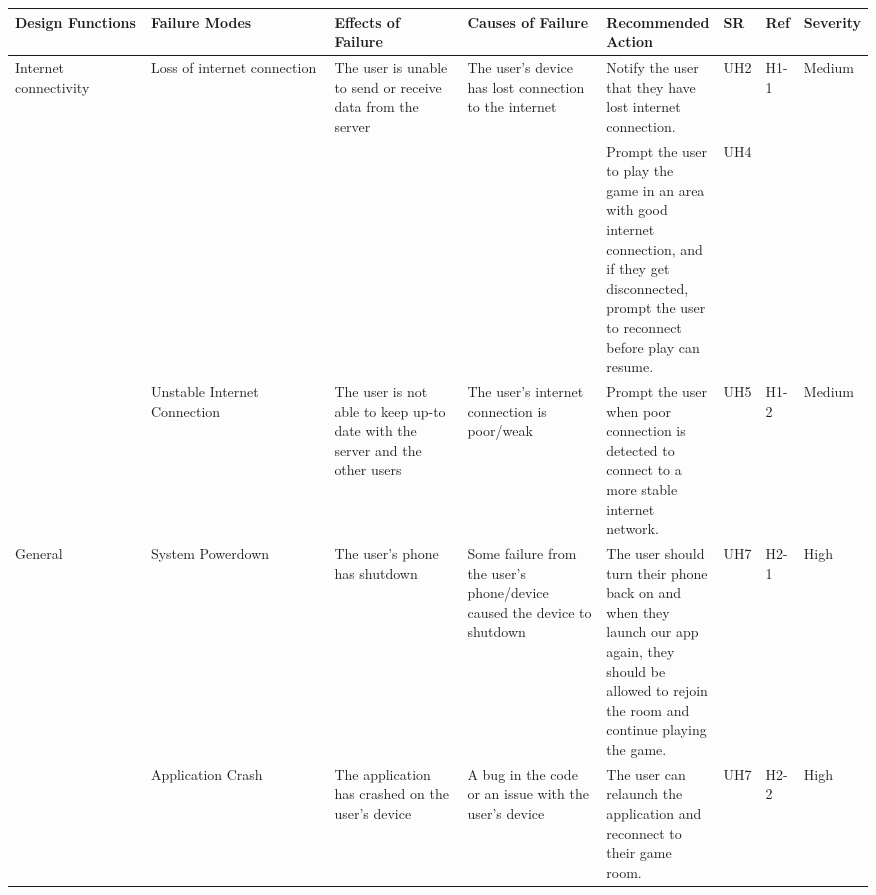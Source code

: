 \documentclass{article}
\begin{document}
\begin{table}[H]
    \begin{adjustbox}{width=(/5)}
    \centering
    

    \begin{tabular}{|p{0.20\linewidth} | p{0.30\linewidth} | p{0.20\linewidth}|  p{0.20\linewidth}|  p{0.30\linewidth}|  p{0.07\linewidth}|  p{0.07\linewidth}|p{0.12\linewidth}| }
    \hline
         \textbf{Design Functions} & \textbf{Failure Modes} & \textbf{Effects of Failure} & \textbf{Causes of Failure} & \textbf{Recommended Action} & \textbf{SR} & \textbf{Ref} & \textbf{Severity}\\
         \hline
        Internet connectivity      &      Loss of internet connection           &       The user is unable to send or receive data from the server                      &                The user's device has lost connection to the internet            &                  Notify the user that they have lost internet connection. &UH2&H1-1&Medium\\&&&& Prompt the user to play the game in an area with good internet connection, and if they get disconnected, prompt the user to reconnect before play can resume.           & UH4            &           &                  \\
                                   &     Unstable Internet Connection     &  The user is not able to keep up-to date with the server and the other users &  The user's internet connection is poor/weak    &        Prompt the user when poor connection is detected to connect to a more stable internet network.           &  UH5           &  H1-2           &    Medium              \\
          \hline
        General                    &      System Powerdown     &          The user's phone has shutdown                   &     Some failure from the user's phone/device caused the device to shutdown        &     The user should turn their phone back on and when they launch our app again, they should be allowed to rejoin the room and continue playing the game.       & UH7            &   H2-1           &        High          \\
                                   &       Application Crash     &      The application has crashed on the user's device         &     A bug in the code or an issue with the user's device     &     The user can relaunch the application and reconnect to their game room.    &  UH7           &   H2-2          &   High               \\

\end{tabular}
\end{adjustbox}
\end{table}
\end{document}

